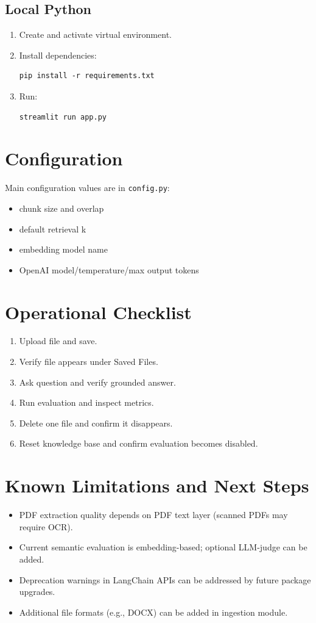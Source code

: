 \documentclass[11pt,a4paper]{article}
\begin{document}
\subsection{Local Python}
\begin{enumerate}[leftmargin=*]
\item Create and activate virtual environment.
\item Install dependencies:
\begin{verbatim}
pip install -r requirements.txt
\end{verbatim}
\item Run:
\begin{verbatim}
streamlit run app.py
\end{verbatim}
\end{enumerate}

\section{Configuration}
Main configuration values are in \texttt{config.py}:
\begin{itemize}[leftmargin=*]
\item chunk size and overlap
\item default retrieval k
\item embedding model name
\item OpenAI model/temperature/max output tokens
\end{itemize}

\section{Operational Checklist}
\begin{enumerate}[leftmargin=*]
\item Upload file and save.
\item Verify file appears under Saved Files.
\item Ask question and verify grounded answer.
\item Run evaluation and inspect metrics.
\item Delete one file and confirm it disappears.
\item Reset knowledge base and confirm evaluation becomes disabled.
\end{enumerate}

\section{Known Limitations and Next Steps}
\begin{itemize}[leftmargin=*]
\item PDF extraction quality depends on PDF text layer (scanned PDFs may require OCR).
\item Current semantic evaluation is embedding-based; optional LLM-judge can be added.
\item Deprecation warnings in LangChain APIs can be addressed by future package upgrades.
\item Additional file formats (e.g., DOCX) can be added in ingestion module.
\end{itemize}
\end{document}
